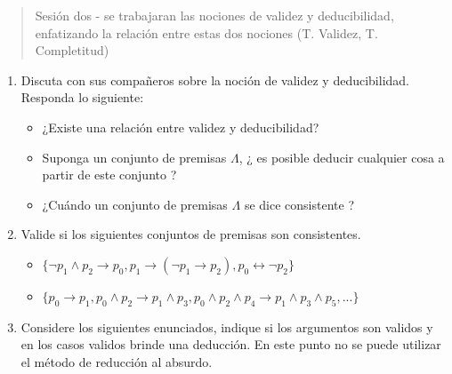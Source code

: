



\maketitle

\begin{abstract}
Sesión dos - se trabajaran las nociones de validez y deducibilidad, enfatizando la relación entre estas dos nociones (T. Validez, T. Completitud)
\end{abstract}


\begin{enumerate}

\item Discuta con sus compañeros sobre la noción de validez y deducibilidad. Responda lo siguiente:
\begin{itemize}
    \item ¿Existe una relación entre validez y deducibilidad?
    \item Suponga un conjunto de premisas $\Lambda$, ¿ es posible deducir cualquier cosa a partir de este conjunto ?
    \item ¿Cuándo un conjunto de premisas $\Lambda$ se dice consistente ?
\end{itemize}

\item Valide si los siguientes conjuntos de premisas son consistentes.

\begin{multicols}{2}
\begin{itemize}
    \item $\{\neg p_{1} \wedge p_{2} \rightarrow p_{0}, p_{1} \rightarrow (\neg  p_{1} \rightarrow p_{2}), p_{0}  \leftrightarrow \neg p_{2}\}$
\end{itemize}
\columnbreak
\begin{itemize}
    \item $\{p_{0} \rightarrow p_{1}, p_{0} \wedge p_{2} \rightarrow p_{1} \wedge p_{3}, p_{0} \wedge p_{2} \wedge p_{4} \rightarrow p_{1} \wedge p_{3} \wedge p_{5}, ... \}$
\end{itemize}
\end{multicols}

\item Considere los siguientes enunciados, indique si los argumentos son validos y en los casos validos brinde una deducción. En este punto no se puede utilizar el método de reducción al absurdo.


\end{enumerate}
